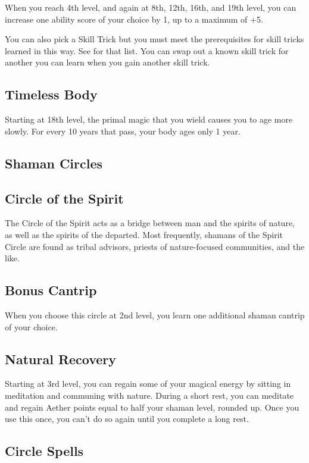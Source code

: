 When you reach 4th level, and again at 8th, 12th, 16th, and 19th level, you can increase one ability score of your choice by 1, up to a maximum of +5.

You can also pick a Skill Trick but you must meet the prerequisites for skill tricks learned in this way. See  for that list. You can swap out a known skill trick for another you can learn when you gain another skill trick.

\subsection{Timeless Body}

Starting at 18th level, the primal magic that you wield causes you to age more slowly. For every 10 years that pass, your body ages only 1 year.

\subsection{Shaman Circles}

\subsection{Circle of the Spirit}

The Circle of the Spirit acts as a bridge between man and the spirits of nature, as well as the spirits of the departed. Most frequently, shamans of the Spirit Circle are found as tribal advisors, priests of nature-focused communities, and the like.

\subsection{Bonus Cantrip}

When you choose this circle at 2nd level, you learn one additional shaman cantrip of your choice.

\subsection{Natural Recovery}

Starting at 3rd level, you can regain some of your magical energy by sitting in meditation and communing with nature. During a short rest, you can meditate and regain Aether points equal to half your shaman level, rounded up. Once you use this once, you can't do so again until you complete a long rest.

\subsection{Circle Spells}

